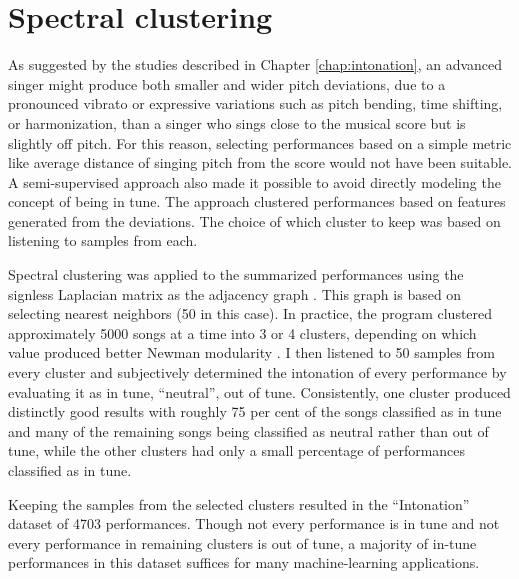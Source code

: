 \section{Spectral clustering}
As suggested by the studies described in Chapter \ref{chap:intonation}, an advanced singer might produce both smaller and wider pitch deviations, due to a pronounced vibrato or expressive variations such as pitch bending, time shifting, or harmonization, than a singer who sings close to the musical score but is slightly off pitch. For this reason, selecting performances based on a simple metric like average distance of singing pitch from the score would not have been suitable. A semi-supervised approach also made it possible to avoid directly modeling the concept of being in tune. The approach clustered performances based on features generated from the deviations. The choice of which cluster to keep was based on listening to samples from each.

Spectral clustering was applied to the summarized performances using the signless Laplacian matrix as the adjacency graph \cite{lucinska2012spectral}. This graph is based on selecting nearest neighbors (50 in this case). In practice, the program clustered approximately 5000 songs at a time into 3 or 4 clusters, depending on which value produced better Newman modularity \cite{newman2006modularity}. I then listened to 50 samples from every cluster and subjectively determined the intonation of every performance by evaluating it as in tune, ``neutral'', out of tune. Consistently, one cluster produced distinctly good results with roughly 75 per cent of the songs classified as in tune and many of the remaining songs being classified as neutral rather than out of tune, while the other clusters had only a small percentage of performances classified as in tune. 

Keeping the samples from the selected clusters resulted in the ``Intonation'' dataset of 4703 performances. Though not every performance is in tune and not every performance in remaining clusters is out of tune, a majority of in-tune performances in this dataset suffices for many machine-learning applications.

